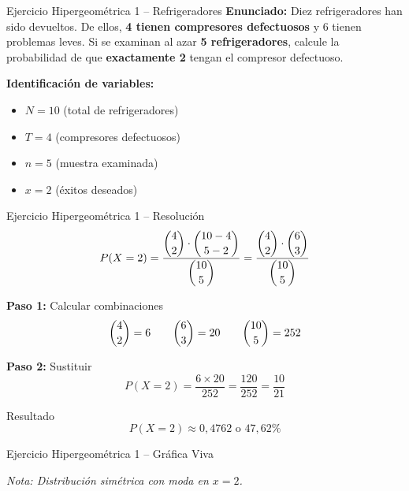 \documentclass[10pt]{beamer}
\begin{document}
\begin{frame}{Ejercicio Hipergeométrica 1 -- Refrigeradores}
\textbf{Enunciado:}
\justifying
Diez refrigeradores han sido devueltos. De ellos, \textbf{4 tienen compresores defectuosos} y 6 tienen problemas leves. Si se examinan al azar \textbf{5 refrigeradores}, calcule la probabilidad de que \textbf{exactamente 2} tengan el compresor defectuoso.

\vspace{0.2cm}
\textbf{Identificación de variables:}
\begin{itemize}
    \item $N = 10$ (total de refrigeradores)
    \item $T = 4$ (compresores defectuosos)
    \item $n = 5$ (muestra examinada)
    \item $x = 2$ (éxitos deseados)
\end{itemize}
\end{frame}

\begin{frame}{Ejercicio Hipergeométrica 1 -- Resolución}
\[
P(X=2) = \frac{\dbinom{4}{2} \cdot \dbinom{10-4}{5-2}}{\dbinom{10}{5}} = \frac{\dbinom{4}{2} \cdot \dbinom{6}{3}}{\dbinom{10}{5}}
\]

\textbf{Paso 1:} Calcular combinaciones
\[
\dbinom{4}{2} = 6 \qquad \dbinom{6}{3} = 20 \qquad \dbinom{10}{5} = 252
\]

\textbf{Paso 2:} Sustituir
\[
P(X=2) = \frac{6 \times 20}{252} = \frac{120}{252} = \frac{10}{21}
\]

\begin{block}{Resultado}
\[
\boxed{P(X=2) \approx 0,4762 \text{ o } 47,62\%}
\]
\end{block}
\end{frame}

\begin{frame}{Ejercicio Hipergeométrica 1 -- Gráfica Viva}
\begin{center}
\end{center}
\footnotesize
\textit{Nota: Distribución simétrica con moda en $x=2$.}
\end{frame}
\end{document}
